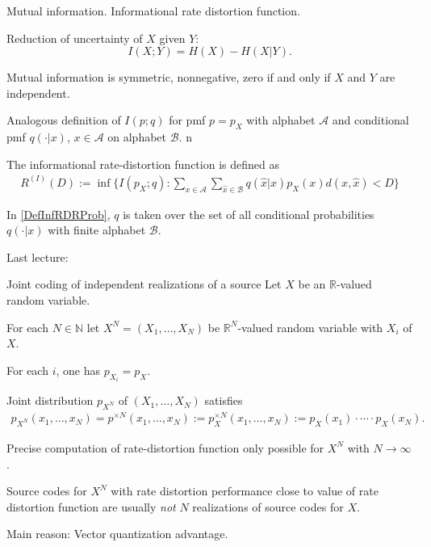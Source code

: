 \begin{frame}{Mutual information. Informational rate distortion function.}
\bit
\item Reduction of uncertainty of $X$ given $Y$:
\[
I(X;Y)=H(X)-H(X|Y).
\]
\item Mutual information is symmetric, nonnegative, zero if and only if $X$ and $Y$ are independent. 
\item Analogous definition of $I(p;q)$ for pmf $p=p_X$ with alphabet $\mathcal{A}$ and conditional pmf $q(\cdot|x)$, $x\in\mathcal{A}$ on 
alphabet $\mathcal{B}$. 
\eit
{}n
\bit
\item The informational rate-distortion function is defined as 
\begin{align}\label{DefInfRDRProb}
R^{(I)}(D):=\inf\{I(p_X;q)\colon \sum_{x\in\mathcal{A}}\sum_{\hat{x}\in\mathcal{B}}q(\hat{x}|x)p_X(x)d(x,\hat{x})<D\}
\end{align}
\item In \eqref{DefInfRDRProb}, $q$ is taken over the set of all conditional probabilities $q(\cdot|x)$ with finite alphabet $\mathcal{B}$.
\item Last lecture:  
\eit
\end{frame}

\begin{frame}{Joint coding of independent realizations of a source}
Let $X$ be an $\mathbb{R}$-valued random variable.
 
\bit
\item For each $N\in\mathbb{N}$ let $X^N=(X_1,\dots,X_N)$ be $\mathbb{R}^N$-valued random variable with  $X_i$ of $X$.
\item For each $i$, one has 
$p_{X_i}=p_{X}$.
\item Joint distribution $p_{X^N}$ of $(X_1,\dots,X_N)$ 
satisfies
\begin{align}\label{DefJointI}
p_{X^N}(x_1,\dots,x_N)=p^{\times N}(x_1,\dots,x_N):=p^{\times N}_X(x_1,\dots,x_N):=p_{X}(x_1)\cdot \cdots \cdot p_{X}(x_N). 
\end{align}
\item Precise computation of rate-distortion function only possible for $X^N$ with $N\to\infty$.
\item Source codes for $X^N$ with rate distortion performance close to value of rate distortion function are usually \textit{not} $N$ realizations of source codes for $X$. 
\item Main reason: Vector quantization advantage. 
\eit
\end{frame}


